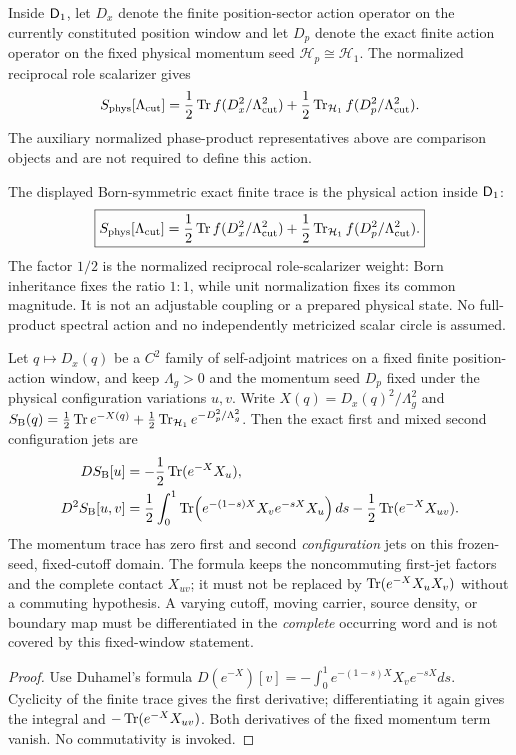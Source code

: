 \documentclass[12pt,a4paper]{article}
\begin{document}
\begin{corollary}
\label{p3:thm:sectorwise-from-D}
Inside \(\mathsf{D}_1\), let \(D_x\) denote the finite position-sector action
operator on the currently constituted position window and let \(D_p\) denote
the exact finite action operator on the fixed physical momentum seed
\(\mathcal H_p\cong\mathcal H_1\).  The normalized reciprocal role scalarizer gives
\[
 S_{\rm phys}[\Lambda_{\mathrm{cut}}]
 =\frac12\operatorname{Tr} f(D_x^2/\Lambda_{\mathrm{cut}}^2)
 +\frac12\operatorname{Tr}_{\mathcal H_1} f(D_p^2/\Lambda_{\mathrm{cut}}^2).
\]
The auxiliary normalized phase-product representatives above are comparison
objects and are not required to define this action.
\end{corollary}

\begin{definition}
\label{p3:def:physical_spectral_action}
The displayed Born-symmetric exact finite trace is the physical action inside
\(\mathsf{D}_1\):
\[
 \boxed{S_{\rm phys}[\Lambda_{\mathrm{cut}}]
 =\frac12\operatorname{Tr} f(D_x^2/\Lambda_{\mathrm{cut}}^2)
 +\frac12\operatorname{Tr}_{\mathcal H_1} f(D_p^2/\Lambda_{\mathrm{cut}}^2).}
\]
The factor \(1/2\) is the normalized reciprocal role-scalarizer weight: Born
inheritance fixes the ratio \(1:1\), while unit normalization fixes its common
magnitude.  It is not an adjustable coupling or a prepared physical state.  No
full-product spectral action and no independently metricized
scalar circle is assumed.
\end{definition}

\begin{proposition}
\label{p3b:prop:v245-exact-finite-heat-two-jet}
Let $q\mapsto D_x(q)$ be a $C^2$ family of self-adjoint matrices
on a fixed finite position-action window, and keep $\Lambda_g>0$
and the momentum seed $D_p$ fixed under the physical configuration
variations $u,v$. Write $X(q)=D_x(q)^2/\Lambda_g^2$ and
$S_{\rm B}(q)=\frac12\operatorname{Tr} e^{-X(q)}+\frac12\operatorname{Tr}_{\mathcal H_1}
 e^{-D_p^2/\Lambda_g^2}$. Then the exact first and mixed second
configuration jets are
\begin{align}
 DS_{\rm B}[u]&=-\frac12\operatorname{Tr}(e^{-X}X_u),\\
 D^2S_{\rm B}[u,v]
 &=\frac12\int_0^1\operatorname{Tr}\!\left(
  e^{-(1-s)X}X_v e^{-sX}X_u\right)ds
  -\frac12\operatorname{Tr}(e^{-X}X_{uv}).
 \label{p3b:eq:v245-finite-heat-two-jet}
\end{align}
The momentum trace has zero first and second \emph{configuration} jets
on this frozen-seed, fixed-cutoff domain.  The formula keeps the
noncommuting first-jet factors and the complete contact $X_{uv}$;
it must not be replaced by $\operatorname{Tr}(e^{-X}X_uX_v)$ without a commuting
hypothesis.  A varying cutoff, moving carrier, source density, or
boundary map must be differentiated in the \emph{complete} occurring
word and is not covered by this fixed-window statement.
\end{proposition}
\begin{proof}
Use Duhamel's formula
$D(e^{-X})[v]=-\int_0^1 e^{-(1-s)X}X_v e^{-sX}ds$.
Cyclicity of the finite trace gives the first derivative; differentiating
it again gives the integral and $-\operatorname{Tr}(e^{-X}X_{uv})$.  Both derivatives
of the fixed momentum term vanish. No commutativity is invoked.
\end{proof}
\end{document}
